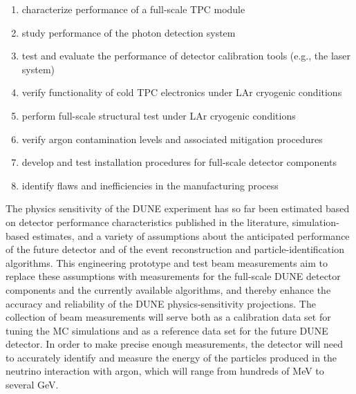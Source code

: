  \begin{enumerate}
 \item characterize performance of a full-scale TPC module
 \item study performance of the photon detection system
 \item test and evaluate the performance of detector calibration tools (e.g., the laser system)
  \item verify functionality of cold TPC electronics under LAr cryogenic conditions
  \item perform full-scale structural test under LAr cryogenic conditions
  \item verify argon contamination levels and associated mitigation procedures
  \item develop and test installation procedures for full-scale detector components
  \item identify flaws and inefficiencies in the manufacturing process
\end{enumerate}



The physics sensitivity of the DUNE experiment has so far been estimated based on detector performance characteristics published in the literature, simulation-based estimates, and %
a variety of assumptions about the anticipated performance of the future detector and of the event reconstruction and particle-identification algorithms.
This engineering prototype and test beam measurements aim to replace these assumptions with measurements for the full-scale DUNE detector components and the currently available algorithms,
and thereby %
enhance the accuracy and reliability of the DUNE physics-sensitivity projections.
The collection of beam measurements will serve both as a calibration data set for tuning the MC simulations and %
as a reference data set for %
the future DUNE detector. 
%
In order to make %
precise enough measurements, the  detector will need to accurately identify and measure the energy of the particles produced in the neutrino interaction with argon, which will range from hundreds of MeV to several GeV.

